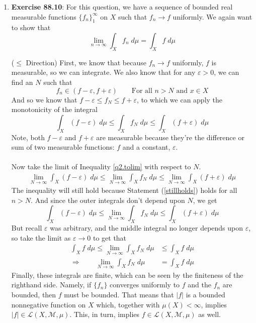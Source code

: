 \documentclass[12pt]{article}
\theoremstyle{plain}
\theoremstyle{definition}
\theoremstyle{remark}
\begin{document}
\begin{enumerate}
\begin{enumerate}
\item \textbf{Exercise 88.10}: For this question, we have a sequence of bounded real measurable functions $\{f_n\}^\infty_1$ on $X$ such that $f_n\rightarrow f$ uniformly. We again want to show that 
\begin{equation}
    \lim_{n\rightarrow\infty} \int_X f_n \; d\mu
    = \int_X f \; d\mu
\end{equation}
    
($\leq$ Direction) First, we know that because $f_n\rightarrow f$ uniformly, $f$ is measurable, so we can integrate. We also know that for any $\varepsilon>0$, we can find an $N$ such that 
\begin{equation}
    \label{stillholds}
    f_n \in (f-\varepsilon, f+\varepsilon) 
    \qquad \text{For all $n>N$ and $x\in X$}
\end{equation}
And so we know that $f-\varepsilon\leq f_N\leq f+\varepsilon$, to which we can apply the monotonicity of the integral
\begin{equation}
    \label{q2.tolim}
    \int_X (f-\varepsilon) \; d\mu\leq
    \int_X f_N \; d\mu \leq \int_X (f+\varepsilon) \; d\mu
\end{equation}
Note, both $f-\varepsilon$ and $f+\varepsilon$ are measurable because they're the difference or sum of two measurable functions: $f$ and a constant, $\varepsilon$. 
\\
\\
Now take the limit of Inequality \ref{q2.tolim} with respect to $N$. 
\begin{align*}
    \lim_{N\rightarrow\infty} \int_X (f-\varepsilon) \; d\mu
    \leq \lim_{N\rightarrow\infty}
    \int_X f_N \; d\mu \leq 
    \lim_{N\rightarrow\infty}\int_X (f+\varepsilon) \; d\mu
\end{align*}
The inequality will still hold because Statement (\ref{stillholds}) holds for all $n>N$. And since the outer integrals don't depend upon $N$, we get
\begin{equation}
    \int_X (f-\varepsilon) \; d\mu \leq
    \lim_{N\rightarrow\infty}\int_X f_N \; d\mu \leq 
    \int_X (f+\varepsilon) \; d\mu
\end{equation}
But recall $\varepsilon$ was arbitrary, and the middle integral no longer depends upon $\varepsilon$, so take the limit as $\varepsilon\rightarrow0$ to get that 
\begin{align*}
    \int_X f \; d\mu \leq
    \lim_{N\rightarrow\infty}\int_X f_N \; d\mu &\leq 
    \int_X f \; d\mu \\
    \Rightarrow\qquad
    \lim_{N\rightarrow\infty}\int_X f_N \; d\mu &=
    \int_X f \; d\mu 
\end{align*}
Finally, these integrals are finite, which can be seen by the finiteness of the righthand side. Namely, if $\{f_n\}$ converges uniformly to $f$ and the $f_n$ are bounded, then $f$ must be bounded. That means that $|f|$ is a bounded nonnegative function on $X$ which, together with $\mu(X)<\infty$, implies $|f|\in\mathscr{L}(X,\mathscr{M},\mu)$. This, in turn, implies $f\in\mathscr{L}(X,\mathscr{M},\mu)$ as well.
\end{enumerate}


\end{enumerate}
\end{document}
